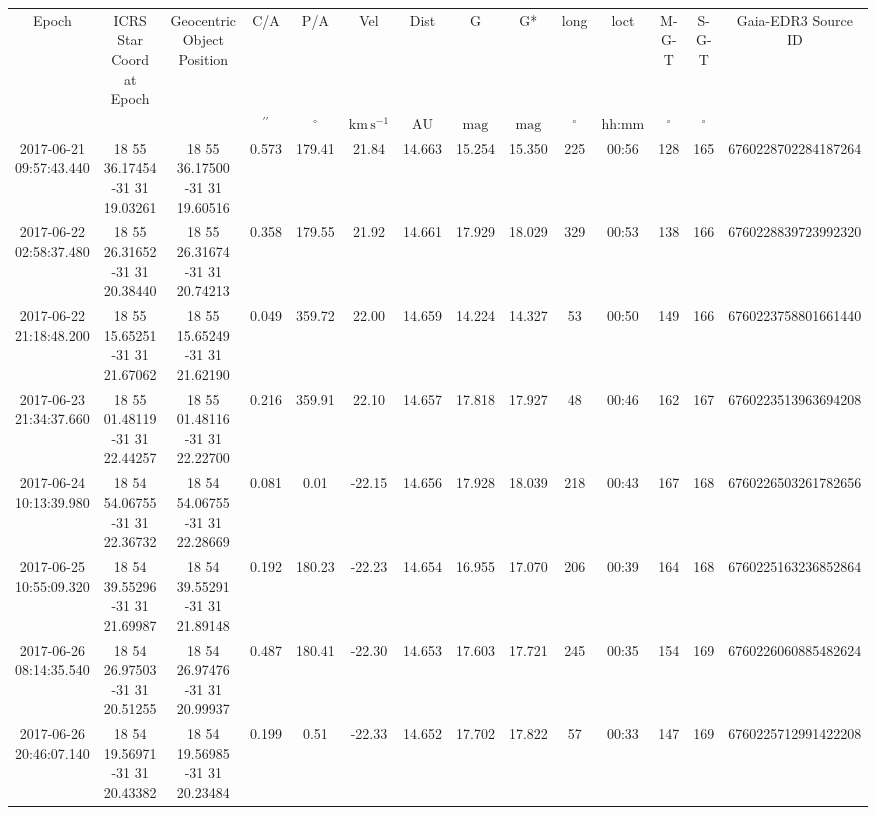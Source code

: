 \begin{table}
\begin{tabular}{cccccccccccccc}
Epoch & ICRS Star Coord at Epoch & Geocentric Object Position & C/A & P/A & Vel & Dist & G & G* & long & loct & M-G-T & S-G-T & Gaia-EDR3 Source ID \\
 &  &  & $\mathrm{{}^{\prime\prime}}$ & $\mathrm{{}^{\circ}}$ & $\mathrm{km\,s^{-1}}$ & $\mathrm{AU}$ & $\mathrm{mag}$ & $\mathrm{mag}$ & $\mathrm{{}^{\circ}}$ & hh:mm & $\mathrm{{}^{\circ}}$ & $\mathrm{{}^{\circ}}$ &  \\
2017-06-21 09:57:43.440 & 18 55 36.17454 -31 31 19.03261 & 18 55 36.17500 -31 31 19.60516 & 0.573 & 179.41 & 21.84 & 14.663 & 15.254 & 15.350 & 225 & 00:56 & 128 & 165 & 6760228702284187264 \\
2017-06-22 02:58:37.480 & 18 55 26.31652 -31 31 20.38440 & 18 55 26.31674 -31 31 20.74213 & 0.358 & 179.55 & 21.92 & 14.661 & 17.929 & 18.029 & 329 & 00:53 & 138 & 166 & 6760228839723992320 \\
2017-06-22 21:18:48.200 & 18 55 15.65251 -31 31 21.67062 & 18 55 15.65249 -31 31 21.62190 & 0.049 & 359.72 & 22.00 & 14.659 & 14.224 & 14.327 & 53 & 00:50 & 149 & 166 & 6760223758801661440 \\
2017-06-23 21:34:37.660 & 18 55 01.48119 -31 31 22.44257 & 18 55 01.48116 -31 31 22.22700 & 0.216 & 359.91 & 22.10 & 14.657 & 17.818 & 17.927 & 48 & 00:46 & 162 & 167 & 6760223513963694208 \\
2017-06-24 10:13:39.980 & 18 54 54.06755 -31 31 22.36732 & 18 54 54.06755 -31 31 22.28669 & 0.081 & 0.01 & -22.15 & 14.656 & 17.928 & 18.039 & 218 & 00:43 & 167 & 168 & 6760226503261782656 \\
2017-06-25 10:55:09.320 & 18 54 39.55296 -31 31 21.69987 & 18 54 39.55291 -31 31 21.89148 & 0.192 & 180.23 & -22.23 & 14.654 & 16.955 & 17.070 & 206 & 00:39 & 164 & 168 & 6760225163236852864 \\
2017-06-26 08:14:35.540 & 18 54 26.97503 -31 31 20.51255 & 18 54 26.97476 -31 31 20.99937 & 0.487 & 180.41 & -22.30 & 14.653 & 17.603 & 17.721 & 245 & 00:35 & 154 & 169 & 6760226060885482624 \\
2017-06-26 20:46:07.140 & 18 54 19.56971 -31 31 20.43382 & 18 54 19.56985 -31 31 20.23484 & 0.199 & 0.51 & -22.33 & 14.652 & 17.702 & 17.822 & 57 & 00:33 & 147 & 169 & 6760225712991422208 \\
\end{tabular}
\end{table}
